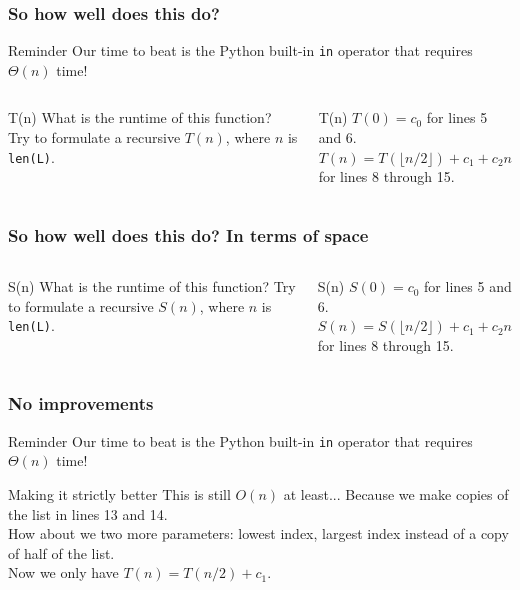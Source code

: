 \begin{frame}
	\frametitle{So how well does this do?}

		\begin{block}{Reminder}
			Our time to beat is the Python built-in \texttt{in} operator that requires $\Theta(n)$ time!
		\end{block}	
		\begin{columns}
					
			\pause
			\begin{block}{T(n)}
				What is the runtime of this function? 
				Try to formulate a recursive $T(n)$, where $n$ is \texttt{len(L)}.
			\end{block}	
			\pause
			\begin{block}{T(n)}
				$T(0) = c_0$ for lines 5 and 6.\\
				$T(n) = T(\lfloor n/2 \rfloor) + c_1 + c_2n$ for lines 8 through 15.
			\end{block}
		\end{columns}
\end{frame}

\begin{frame}
	\frametitle{So how well does this do? In terms of space}

		\begin{columns}
			\column{0.605\textwidth}
				
			\column{0.405\textwidth}
			\begin{block}{S(n)}
				What is the runtime of this function? 
				Try to formulate a recursive $S(n)$, where $n$ is \texttt{len(L)}.
			\end{block}	
			\pause
			\begin{block}{S(n)}
				$S(0) = c_0$ for lines 5 and 6.\\
				$S(n) = S(\lfloor n/2 \rfloor) + c_1 + c_2n$ for lines 8 through 15.
			\end{block}
		\end{columns}
\end{frame}

\begin{frame}
	\frametitle{No improvements}
		\begin{block}{Reminder}
			Our time to beat is the Python built-in \texttt{in} operator that requires $\Theta(n)$ time!
		\end{block}	
		\begin{block}{Making it strictly better}
			This is still $O(n)$ at least... Because we make copies of the list in lines 13 and 14.	\\
			How about we two more parameters: lowest index, largest index instead of a copy of half of the list.\\
			Now we only have $T(n) = T(n/2) + c_1$.
		\end{block}	
\end{frame}

